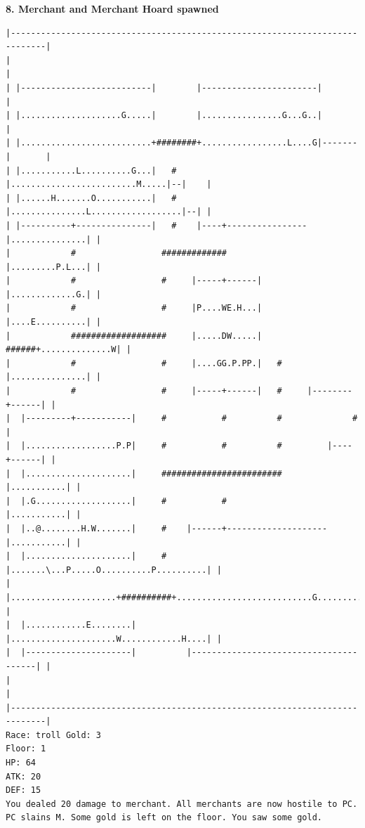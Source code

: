 \documentclass[11pt]{article}
\theoremstyle{plain}
\begin{document}
\newpage
\textbf{8. Merchant and Merchant Hoard spawned}
\begin{Verbatim}[fontsize=\scriptsize]
|-----------------------------------------------------------------------------|
|                                                                             |
| |--------------------------|        |-----------------------|               |
| |....................G.....|        |................G...G..|               |
| |..........................+########+.................L....G|-------|       |
| |...........L..........G...|   #    |.........................M.....|--|    |
| |......H.......O...........|   #    |...............L..................|--| |
| |----------+---------------|   #    |----+----------------|...............| |
|            #                 #############                |.........P.L...| |
|            #                 #     |-----+------|         |.............G.| |
|            #                 #     |P....WE.H...|         |....E..........| |
|            ###################     |.....DW.....|   ######+..............W| |
|            #                 #     |....GG.P.PP.|   #     |...............| |
|            #                 #     |-----+------|   #     |--------+------| |
|  |---------+-----------|     #           #          #              #        |
|  |..................P.P|     #           #          #         |----+------| |
|  |.....................|     ########################         |...........| |
|  |.G...................|     #           #                    |...........| |
|  |..@........H.W.......|     #    |------+--------------------|...........| |
|  |.....................|     #    |.......\...P.....O..........P..........| |
|  |.....................+##########+...........................G...........| |
|  |............E........|          |.....................W............H....| |
|  |---------------------|          |---------------------------------------| |
|                                                                             |
|-----------------------------------------------------------------------------|
Race: troll Gold: 3                                                    Floor: 1
HP: 64
ATK: 20
DEF: 15
You dealed 20 damage to merchant. All merchants are now hostile to PC. PC slains M. Some gold is left on the floor. You saw some gold. 


\end{Verbatim}
\end{document}
